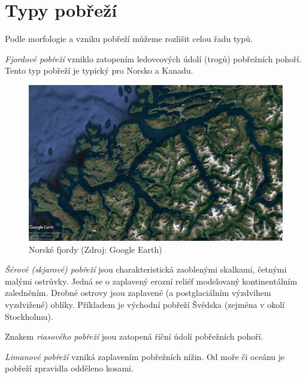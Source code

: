 \section{Typy pobřeží}
Podle morfologie a vzniku pobřeží můžeme rozlišit celou řadu typů. 

\emph{Fjordové pobřeží} vzniklo zatopením ledovcových údolí (trogů) pobřežních pohoří. Tento typ pobřeží je typický pro Norsko a Kanadu. 

\begin{figure}[h]
	\centering
	\includegraphics[width=1\linewidth]{obrazky/marine/fjord}
	\caption{Norské fjordy (Zdroj: Google Earth)}
	\label{fig:fjord}
\end{figure}


\emph{Šérové (skjarové) pobřeží}  jsou charakteristická zaoblenými skalkami, četnými malými ostrůvky. Jedná se o zaplavený erozní reliéf modelovaný kontinentálním zaledněním. Drobné ostrovy jsou zaplavené (a postglaciálním výzdvihem vyzdvižené) oblíky. Příkladem je východní pobřeží Švédska (zejména v okolí Stockholmu).

Znakem \emph{riasového pobřeží} jsou zatopená říční údolí pobřežních pohoří.

\emph{Limanové pobřeží} vzniká zaplavením pobřežních nížin. Od moře či oceánu je pobřeží zpravidla odděleno kosami.


